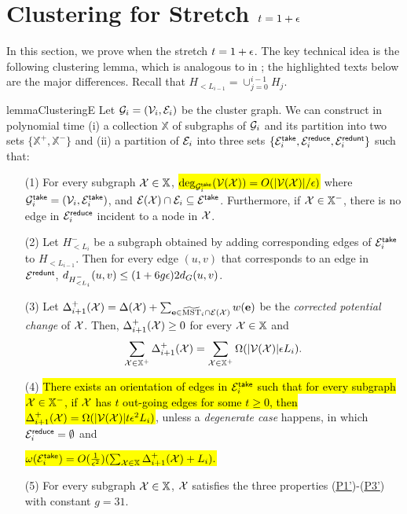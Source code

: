 
\section{Clustering for Stretch $t = 1+ \epsilon$}\label{sec:stretch1E}

In this section, we prove  when the stretch $t = 1+\epsilon$. The key technical idea is the following clustering lemma, which is analogous to  in ; the highlighted texts below are the major differences.  Recall that $H_{< L_{i-1}} = \cup_{j=0}^{i-1} H_{j}$. 



\begin{restatable}{lemma}{ClusteringE}
	\label{lm:ClusteringE} Let $\mathcal{G}_i = (\mathcal{V}_i,\mathcal{E}_i)$ be the cluster graph. We can construct in polynomial time  (i) a collection $\mathbb{X}$ of subgraphs of $\mathcal{G}_i$ and its partition into  two sets $\{\mathbb{X}^{+}, \mathbb{X}^{-}\}$ and (ii) a partition of $\mathcal{E}_i$ into three sets $\{\mathcal{E}_i^{\mathsf{take}}, \mathcal{E}_i^{\mathsf{reduce}}, \mathcal{E}_i^{\mathsf{redunt}}\}$ such that:
	\begin{enumerate}
		\item[(1)] For every subgraph $\mathcal{X} \in \mathbb{X}$,  \hl{$\deg_{\mathcal{G}^{\mathsf{take}}_i}(\mathcal{V}(\mathcal{X})) = O(|\mathcal{V}(\mathcal{X})|/\epsilon)$}  where $\mathcal{G}^{\mathsf{take}}_i = (\mathcal{V}_i,\mathcal{E}_i^{\mathsf{take}})$, and $\mathcal{E}(\mathcal{X})\cap \mathcal{E}_i \subseteq \mathcal{E}^{\mathsf{take}}$. Furthermore, if $\mathcal{X} \in \mathbb{X}^{-}$, there is no edge in $\mathcal{E}_i^{\mathsf{reduce}}$ incident to a node in $\mathcal{X}$.
		
		\item[(2)] Let $H_{< L_i}^{-}$ be a subgraph obtained by adding corresponding edges of $\mathcal{E}_i^{\mathsf{take}}$ to $H_{< L_{i-1}}$.  Then for every edge $(u,v)$ that corresponds to an edge in $\mathcal{E}^{\mathsf{redunt}}$, $d_{H_{< L_i}^{-}}(u,v)\leq(1+6g\epsilon)2d_G(u,v)$. 
		
		\item[(3)] Let $\Delta_{i+1}^+(\mathcal{X}) = \Delta(\mathcal{X}) + \sum_{\mathbf{e} \in \widetilde{\mathrm{MST}}_i\cap \mathcal{E}(\mathcal{X})}w(\mathbf{e})$ be the \emph{corrected potential change} of $\mathcal{X}$. Then, $\Delta_{i+1}^+(\mathcal{X}) \geq 0$ for every $\mathcal{X} \in \mathbb{X}$ and 
		\begin{equation}\label{eq:averagePotential-t1E}
			\sum_{\mathcal{X} \in \mathbb{X}^{+}} \Delta_{i+1}^+(\mathcal{X}) = \sum_{\mathcal{X} \in \mathbb{X}^{+}} \Omega(|\mathcal{V}(\mathcal{X})|\epsilon L_i). 
		\end{equation}
		\item[(4)] \hl{There exists an orientation of edges in $\mathcal{E}_i^{\mathsf{take}}$ such that for every subgraph $\mathcal{X} \in \mathbb{X}^{-}$, if $\mathcal{X}$ has $t$ out-going edges for some $t\geq 0$, then $\Delta^+_{i+1}(\mathcal{X}) =\Omega(|\mathcal{V}(\mathcal{X})|t\epsilon^2 L_i)$}, unless a \emph{degenerate case} happens, in which  $\mathcal{E}^{\mathsf{reduce}}_i = \emptyset$ and  
		\begin{center}
			\hl{$\omega(\mathcal{E}_i^{\mathsf{take}}) = O(\frac{1}{\epsilon^2})(\sum_{\mathcal{X} \in \mathbb{X}} \Delta_{i+1}^+(\mathcal{X}) + L_i).$}
		\end{center}
 		\item[(5)] For every subgraph $\mathcal{X} \in \mathbb{X}$, $\mathcal{X}$ satisfies the three properties (\hyperlink{P1'}{P1'})-(\hyperlink{P3'}{P3'}) with constant $g=31$. 
	\end{enumerate}	
\end{restatable}
